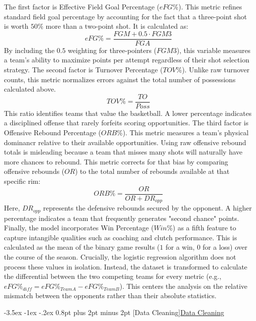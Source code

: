 \documentclass[12pt,leqno]{article}\usepackage[pdftex]{graphicx}\usepackage[usenames,dvipsnames]{xcolor}
\makeatletter
\renewcommand\subsubsection{\@startsection {subsubsection}{1}{\z@}%
{-3.5ex \@plus -1ex \@minus -.2ex}%
{0.8pt plus 2pt minus 2pt}%
{\normalfont}}
\newcommand{\usubsubsection}[1]{\subsubsection[#1]{\normalfont\normalfont\underline{#1}}}%
\theoremstyle{remark}
\makeatother
\begin{document}
The first factor is Effective Field Goal Percentage ($eFG\%$). This metric refines standard field goal percentage by accounting for the fact that a three-point shot is worth $50\%$ more than a two-point shot. It is calculated as:
\begin{equation}
eFG\% = \frac{FGM + 0.5 \cdot FGM3}{FGA}
\end{equation}
By including the $0.5$ weighting for three-pointers ($FGM3$), this variable measures a team's ability to maximize points per attempt regardless of their shot selection strategy.
The second factor is Turnover Percentage ($TOV\%$). Unlike raw turnover counts, this metric normalizes errors against the total number of possessions calculated above.
\begin{equation}
TOV\% = \frac{TO}{Poss}
\end{equation}
This ratio identifies teams that value the basketball. A lower percentage indicates a disciplined offense that rarely forfeits scoring opportunities.
The third factor is Offensive Rebound Percentage ($ORB\%$). This metric measures a team's physical dominancr relative to their available opportunities. Using raw offensive rebound totals is misleading because a team that misses many shots will naturally have more chances to rebound. This metric corrects for that bias by comparing offensive rebounds ($OR$) to the total number of rebounds available at that specific rim:
\begin{equation}
ORB\% = \frac{OR}{OR + DR_{opp}}
\end{equation}
Here, $DR_{opp}$ represents the defensive rebounds secured by the opponent. A higher percentage indicates a team that frequently generates "second chance" points.
Finally, the model incorporates Win Percentage ($Win\%$) as a fifth feature to capture intangible qualities such as coaching and clutch performance. This is calculated as the mean of the binary game results ($1$ for a win, $0$ for a loss) over the course of the season. Crucially, the logistic regression algorithm does not process these values in isolation. Instead, the dataset is transformed to calculate the differential between the two competing teams for every metric (e.g., $eFG\%_{diff} = eFG\%_{TeamA} - eFG\%_{TeamB}$). This centers the analysis on the relative mismatch between the opponents rather than their absolute statistics.

\usubsubsection{Data Cleaning}
\end{document}
